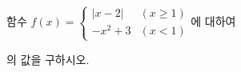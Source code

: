 함수 $f(x)=\begin{cases} |x-2| & (x\ge 1) \\ -x^2+3 & (x<1) \end{cases}$에 대하여 \par\smallskip{}\par\smallskip\noindent 의 값을 구하시오.
